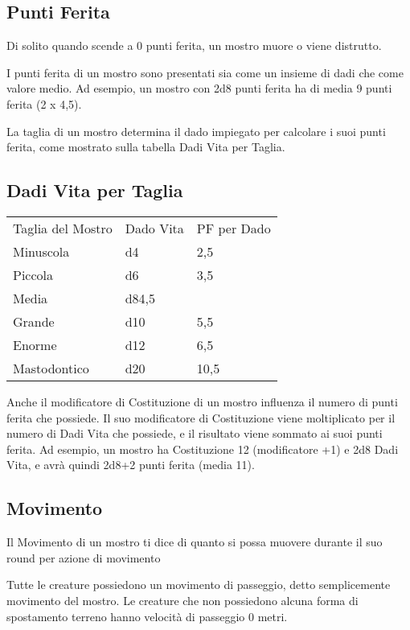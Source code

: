 \begin{multicols}{2}
\subsection{Punti Ferita}

Di solito quando scende a 0 punti ferita, un mostro muore o viene
distrutto.

I punti ferita di un mostro sono presentati sia come un insieme di dadi
che come valore medio. Ad esempio, un mostro con 2d8 punti ferita ha di
media 9 punti ferita (2 x 4,5).

La taglia di un mostro determina il dado impiegato per calcolare i suoi
punti ferita, come mostrato sulla tabella Dadi Vita per Taglia.

\subsection{Dadi Vita per Taglia}

\medskip
\begin{tabular}{lll}
\toprule
Taglia del Mostro & Dado Vita & PF per Dado\\
Minuscola &d4&2,5\\
Piccola &d6&3,5\\
Media&d84,5\\
Grande&d10&5,5\\
Enorme&d12&6,5\\
Mastodontico&d20&10,5\\
\end{tabular}
\medskip

Anche il modificatore di Costituzione di un mostro influenza il numero
di punti ferita che possiede. Il suo modificatore di Costituzione viene
moltiplicato per il numero di Dadi Vita che possiede, e il risultato
viene sommato ai suoi punti ferita. Ad esempio, un mostro ha
Costituzione 12 (modificatore +1) e 2d8 Dadi Vita, e avrà quindi 2d8+2
punti ferita (media 11).

\subsection{Movimento}

Il Movimento di un mostro ti dice di quanto si possa muovere durante il suo round per azione di movimento

Tutte le creature possiedono un movimento di passeggio, detto semplicemente movimento del mostro. Le creature che non possiedono alcuna forma di spostamento terreno hanno velocità di passeggio 0 metri.


\end{multicols}
